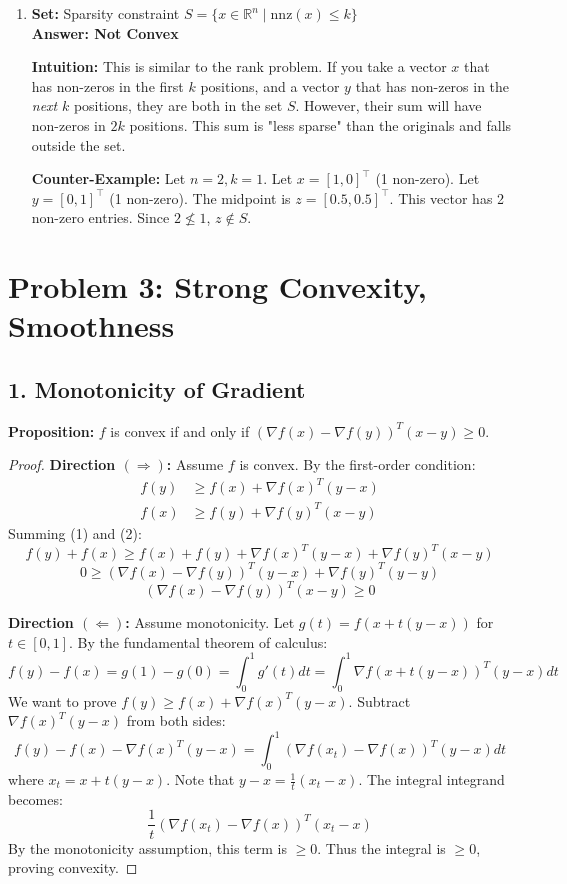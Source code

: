 \documentclass[12pt]{article}
\begin{document}
\begin{enumerate}
    \item[(d)] \textbf{Set:} Sparsity constraint $S = \{x \in \mathbb{R}^n \mid \text{nnz}(x) \le k\}$ \\
    \textbf{Answer: Not Convex}
    
    \textbf{Intuition:} 
    This is similar to the rank problem. If you take a vector $x$ that has non-zeros in the first $k$ positions, and a vector $y$ that has non-zeros in the \textit{next} $k$ positions, they are both in the set $S$. However, their sum will have non-zeros in $2k$ positions. This sum is "less sparse" than the originals and falls outside the set.
    
    \textbf{Counter-Example:}
    Let $n=2, k=1$.
    Let $x = [1, 0]^\top$ (1 non-zero).
    Let $y = [0, 1]^\top$ (1 non-zero).
    The midpoint is $z = [0.5, 0.5]^\top$.
    This vector has 2 non-zero entries. Since $2 \not\le 1$, $z \notin S$.
\end{enumerate}

\newpage
\section*{Problem 3: Strong Convexity, Smoothness}

\subsection*{1. Monotonicity of Gradient}
\textbf{Proposition:} $f$ is convex if and only if $(\nabla f(x) - \nabla f(y))^T(x-y) \ge 0$.

\begin{proof}
\textbf{Direction $(\Rightarrow)$:} Assume $f$ is convex. By the first-order condition:
\begin{align}
    f(y) &\ge f(x) + \nabla f(x)^T(y-x) \\
    f(x) &\ge f(y) + \nabla f(y)^T(x-y)
\end{align}
Summing (1) and (2):
$$ f(y) + f(x) \ge f(x) + f(y) + \nabla f(x)^T(y-x) + \nabla f(y)^T(x-y) $$
$$ 0 \ge (\nabla f(x) - \nabla f(y))^T(y-x) + \nabla f(y)^T(y-y) $$
$$ (\nabla f(x) - \nabla f(y))^T(x-y) \ge 0 $$

\textbf{Direction $(\Leftarrow)$:} Assume monotonicity. Let $g(t) = f(x + t(y-x))$ for $t \in [0,1]$. By the fundamental theorem of calculus:
$$ f(y) - f(x) = g(1) - g(0) = \int_0^1 g'(t) dt = \int_0^1 \nabla f(x + t(y-x))^T (y-x) dt $$
We want to prove $f(y) \ge f(x) + \nabla f(x)^T(y-x)$. Subtract $\nabla f(x)^T(y-x)$ from both sides:
$$ f(y) - f(x) - \nabla f(x)^T(y-x) = \int_0^1 (\nabla f(x_t) - \nabla f(x))^T (y-x) dt $$
where $x_t = x+t(y-x)$. Note that $y-x = \frac{1}{t}(x_t - x)$. The integral integrand becomes:
$$ \frac{1}{t} (\nabla f(x_t) - \nabla f(x))^T (x_t - x) $$
By the monotonicity assumption, this term is $\ge 0$. Thus the integral is $\ge 0$, proving convexity.
\end{proof}
\end{document}
